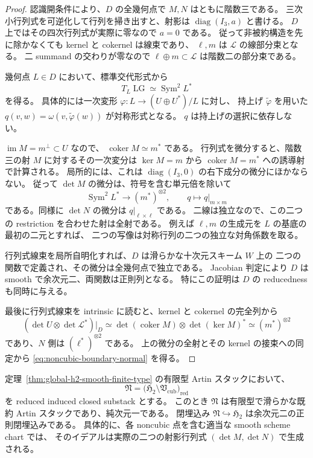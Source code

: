 \begin{proof}
認識開条件により、$D$ の全幾何点で $M,N$ はともに階数三である。
三次小行列式を可逆化して行列を掃き出すと、射影は $\operatorname{diag}(I_3,a)$ と書ける。
$D$ 上ではその四次行列式が実際に零なので $a=0$ である。
従って非被約構造を先に除かなくても kernel と cokernel は線束であり、
$\ell,m$ は $\mathscr L$ の線部分束となる。
二 summand の交わりが零なので $\ell\oplus m\subset\mathscr L$ は階数二の部分束である。

幾何点 $L\in D$ において、標準交代形式から
\[
 T_L\operatorname{LG}\simeq\operatorname{Sym}^2L^*
\]
を得る。
具体的には一次変形 $\varphi:L\to(U\oplus U^*)/L$ に対し、
持上げ $\widetilde\varphi$ を用いた
$q(v,w)=\omega(v,\widetilde\varphi(w))$ が対称形式となる。
$q$ は持上げの選択に依存しない。

$\operatorname{im}M=m^\perp\subset U$ なので、
$\operatorname{coker}M\simeq m^*$ である。
行列式を微分すると、階数三の射 $M$ に対するその一次変分は
$\ker M=m$ から $\operatorname{coker}M=m^*$ への誘導射で計算される。
局所的には、これは $\operatorname{diag}(I_3,0)$ の右下成分の微分にほかならない。
従って $\det M$ の微分は、符号を含む単元倍を除いて
\[
 \operatorname{Sym}^2L^*\longrightarrow(m^*)^{\otimes2},
 \qquad q\longmapsto q|_{m\times m}
\]
である。同様に $\det N$ の微分は $q|_{\ell\times\ell}$ である。
二線は独立なので、この二つの restriction を合わせた射は全射である。
例えば $\ell,m$ の生成元を $L$ の基底の最初の二元とすれば、
二つの写像は対称行列の二つの独立な対角係数を取る。

行列式線束を局所自明化すれば、$D$ は滑らかな十次元スキーム $W$ 上の
二つの関数で定義され、その微分は全幾何点で独立である。
Jacobian 判定により $D$ は smooth で余次元二、両関数は正則列となる。
特にこの証明は $D$ の reducedness も同時に与える。

最後に行列式線束を intrinsic に読むと、kernel と cokernel の完全列から
\[
 (\det U\otimes\det\mathscr L^*)|_D
 \simeq\det(\operatorname{coker}M)\otimes\det(\ker M)^*
 \simeq(m^*)^{\otimes2}
\]
であり、$N$ 側は $(\ell^*)^{\otimes2}$ である。
上の微分の全射とその kernel の接束への同定から
\eqref{eq:noncubic-boundary-normal} を得る。
\end{proof}

\begin{theorem}
\label{thm:noncubic-boundary-smooth-codim-two}
定理~\ref{thm:global-h2-smooth-finite-type} の有限型 Artin スタックにおいて、
\[
 \mathfrak N=
 \bigl(\mathfrak H_2\setminus\mathfrak V_{\mathrm{cub}}\bigr)_{\mathrm{red}}
\]
を reduced induced closed substack とする。
このとき $\mathfrak N$ は有限型で滑らかな既約 Artin スタックであり、純次元一である。
閉埋込み $\mathfrak N\hookrightarrow\mathfrak H_2$ は余次元二の正則閉埋込みである。
具体的に、各 noncubic 点を含む適当な smooth scheme chart では、
そのイデアルは実際の二つの射影行列式 $(\det M,\det N)$ で生成される。
\end{theorem}

